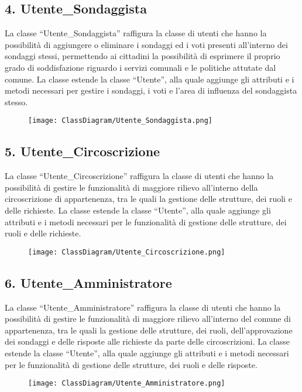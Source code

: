     \subsection*{4. Utente\_Sondaggista}
        La classe ``Utente\_Sondaggista'' raffigura la classe di utenti che hanno la possibilità di aggiungere o eliminare i sondaggi ed i voti presenti all'interno dei sondaggi stessi, permettendo ai cittadini la possibilità di esprimere il proprio grado di soddisfazione riguardo i servizi comunali e le politiche attutate dal comune. La classe estende la classe ``Utente'', alla quale aggiunge gli attributi e i metodi necessari per gestire i sondaggi, i voti e l'area di influenza del sondaggista stesso.
        \begin{figure}[H]
            \texttt{[image: ClassDiagram/Utente\_Sondaggista.png]}
        \end{figure}

    \subsection*{5. Utente\_Circoscrizione}
        La classe ``Utente\_Circoscrizione'' raffigura la classe di utenti che hanno la possibilità di gestire le funzionalità di maggiore rilievo all'interno della circoscrizione di appartenenza, tra le quali la gestione delle strutture, dei ruoli e delle richieste. La classe estende la classe ``Utente'', alla quale aggiunge gli attributi e i metodi necessari per le funzionalità di gestione delle strutture, dei ruoli e delle richieste.
        \begin{figure}[H]
            \texttt{[image: ClassDiagram/Utente\_Circoscrizione.png]}
        \end{figure}

    \subsection*{6. Utente\_Amministratore}
        La classe ``Utente\_Amministratore'' raffigura la classe di utenti che hanno la possibilità di gestire le funzionalità di maggiore rilievo all'interno del comune di appartenenza, tra le quali la gestione delle strutture, dei ruoli, dell'approvazione dei sondaggi e delle risposte alle richieste da parte delle circoscrizioni. La classe estende la classe ``Utente'', alla quale aggiunge gli attributi e i metodi necessari per le funzionalità di gestione delle strutture, dei ruoli e delle risposte.
        \begin{figure}[H]
            \texttt{[image: ClassDiagram/Utente\_Amministratore.png]}
        \end{figure}

